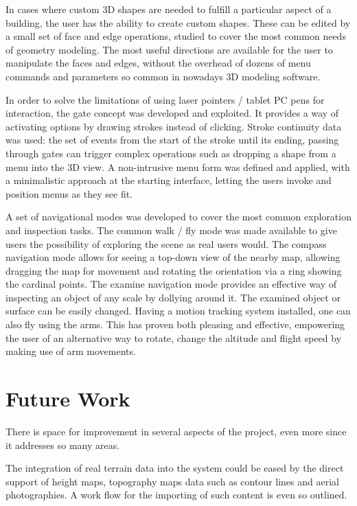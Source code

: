 In cases where custom 3D shapes are needed to fulfill a particular aspect
of a building, the user has the ability to create custom shapes.
These can be edited by a small set of face and edge operations,
studied to cover the most common needs of geometry modeling.
The most useful directions are available for the user to manipulate the
faces and edges, without the overhead of dozens of menu commands and parameters
so common in nowadays 3D modeling software.

In order to solve the limitations of using laser pointers / tablet PC pens
for interaction, the gate concept was developed and exploited.
It provides a way of activating options by drawing strokes instead of clicking.
Stroke continuity data was used: the set of events from the start of the stroke
until its ending, passing through gates can trigger complex operations
such as dropping a shape from a menu into the 3D view.
A non-intrusive menu form was defined and applied, with a minimalistic approach
at the starting interface, letting the users invoke and position menus as they see fit.

A set of navigational modes was developed to cover the most common exploration
and inspection tasks.
The common walk / fly mode was made available to give users the
possibility of exploring the scene as real users would. 
The compass navigation mode allows for seeing a top-down view of the nearby map,
allowing dragging the map for movement and  rotating the orientation
via a ring showing the cardinal points.
The examine navigation mode provides an effective way of inspecting an object of any
scale by dollying around it. The examined object or surface can be easily changed.
Having a motion tracking system installed, one can also fly using the arms.
This has proven both pleasing and effective, empowering the user of an alternative
way to rotate, change the altitude and flight speed by making use of arm movements.


\section{Future Work}

There is space for improvement in several aspects of the project,
even more since it addresses so many areas.

The integration of real terrain data into the system could be eased by
the direct support of height maps, topography maps data such as contour lines
and aerial photographies. A work flow for the importing of such content is
even so outlined.


